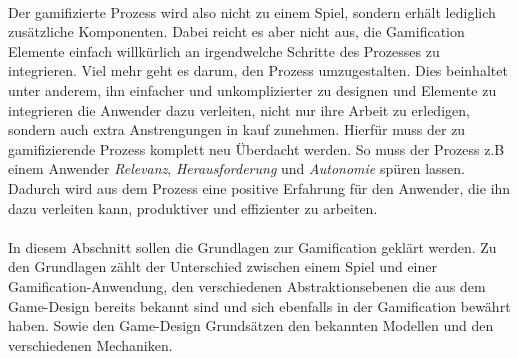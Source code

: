 \documentclass[a4paper,12pt]{scrartcl}
\begin{document}
\\
Der gamifizierte Prozess wird also nicht zu einem Spiel, sondern erhält lediglich zusätzliche Komponenten. Dabei reicht es aber nicht aus, die Gamification Elemente einfach willkürlich an irgendwelche Schritte des Prozesses zu integrieren. Viel mehr geht es darum, den Prozess umzugestalten. Dies beinhaltet unter anderem, ihn einfacher und unkomplizierter zu designen und Elemente zu integrieren die Anwender dazu verleiten, nicht nur ihre Arbeit zu erledigen, sondern auch extra Anstrengungen in kauf zunehmen. Hierfür muss der zu gamifizierende Prozess komplett neu Überdacht werden. So muss der Prozess z.B einem Anwender \textit{Relevanz}, \textit{Herausforderung} und \textit{Autonomie} spüren lassen. Dadurch wird aus dem Prozess eine positive Erfahrung für den Anwender, die ihn dazu verleiten kann, produktiver und effizienter zu arbeiten.
\\\\
In diesem Abschnitt sollen die Grundlagen zur Gamification geklärt werden. Zu den Grundlagen zählt der Unterschied zwischen einem Spiel und einer Gamification-Anwendung, den verschiedenen Abstraktionsebenen die aus dem Game-Design bereits bekannt sind und sich ebenfalls in der Gamification bewährt haben. Sowie den Game-Design Grundsätzen den bekannten Modellen und den verschiedenen Mechaniken. 
\end{document}
